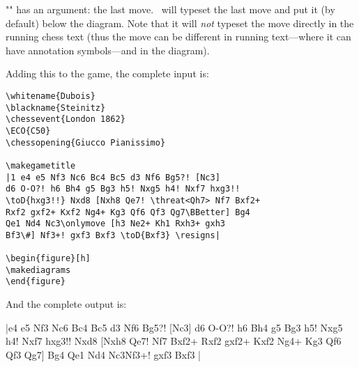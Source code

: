 \documentclass[12pt]{ltxdoc}
\begin{document}
"\toD" has an argument: the last move. \TeXmate\ will typeset the last move and put it (by default) below the diagram. Note that it will \emph{not} typeset the move directly in the running chess text (thus the move can be different in running text---where it can have annotation symbols---and in the diagram).

\bigskip\noindent
Adding this to the game, the complete input is:

\makebarother
\begin{verbatim}
\whitename{Dubois}
\blackname{Steinitz}
\chessevent{London 1862}
\ECO{C50}
\chessopening{Giucco Pianissimo}

\makegametitle
|1 e4 e5 Nf3 Nc6 Bc4 Bc5 d3 Nf6 Bg5?! [Nc3] 
d6 O-O?! h6 Bh4 g5 Bg3 h5! Nxg5 h4! Nxf7 hxg3!! 
\toD{hxg3!!} Nxd8 [Nxh8 Qe7! \threat<Qh7> Nf7 Bxf2+ 
Rxf2 gxf2+ Kxf2 Ng4+ Kg3 Qf6 Qf3 Qg7\BBetter] Bg4 
Qe1 Nd4 Nc3\onlymove [h3 Ne2+ Kh1 Rxh3+ gxh3 
Bf3\#] Nf3+! gxf3 Bxf3 \toD{Bxf3} \resigns|

\begin{figure}[h]
\makediagrams
\end{figure}
\end{verbatim}

\noindent And the complete output is:
\makebarchess
{}

\makegametitle

|e4 e5 Nf3 Nc6 Bc4 Bc5 d3 Nf6 Bg5?! [Nc3] d6 O-O?! h6 Bh4 g5 Bg3 h5! Nxg5 h4! Nxf7 hxg3!!  Nxd8 [Nxh8 Qe7!  Nf7 Bxf2+ Rxf2 gxf2+ Kxf2 Ng4+ Kg3 Qf6 Qf3 Qg7\BBetter] Bg4 Qe1 Nd4 Nc3 Nf3+! gxf3 Bxf3  \resigns|

\begin{figure}
\makediagrams
\end{figure}
\end{document}
